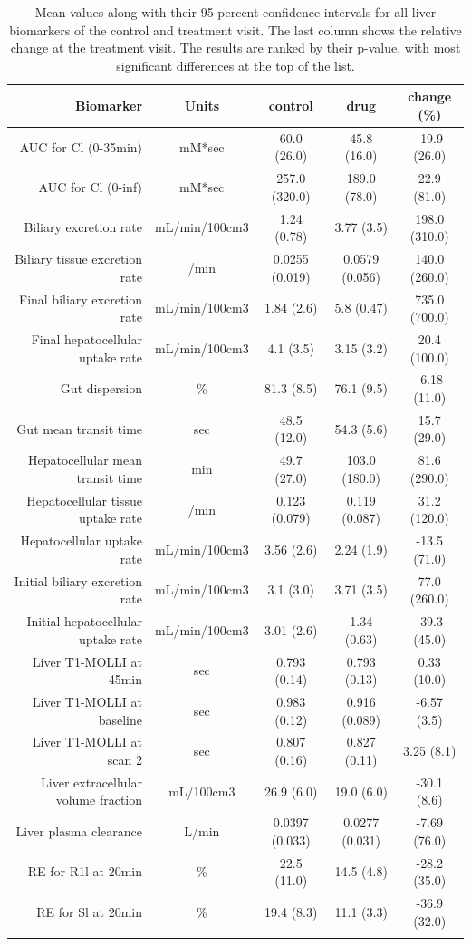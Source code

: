 \documentclass{epflreport}%
\begin{document}
\begin{longtable}{rcccc}%
\hline%
Biomarker&Units&control&drug&change (\%)\\%
\hline%
AUC for Cl (0{-}35min)&mM*sec&60.0 (26.0) &45.8 (16.0) &{-}19.9 (26.0) \\%
AUC for Cl (0{-}inf)&mM*sec&257.0 (320.0) &189.0 (78.0) &22.9 (81.0) \\%
Biliary excretion rate&mL/min/100cm3&1.24 (0.78) &3.77 (3.5) &198.0 (310.0) \\%
Biliary tissue excretion rate&/min&0.0255 (0.019) &0.0579 (0.056) &140.0 (260.0) \\%
Final biliary excretion rate&mL/min/100cm3&1.84 (2.6) &5.8 (0.47) &735.0 (700.0) \\%
Final hepatocellular uptake rate&mL/min/100cm3&4.1 (3.5) &3.15 (3.2) &20.4 (100.0) \\%
Gut dispersion&\%&81.3 (8.5) &76.1 (9.5) &{-}6.18 (11.0) \\%
Gut mean transit time&sec&48.5 (12.0) &54.3 (5.6) &15.7 (29.0) \\%
Hepatocellular mean transit time&min&49.7 (27.0) &103.0 (180.0) &81.6 (290.0) \\%
Hepatocellular tissue uptake rate&/min&0.123 (0.079) &0.119 (0.087) &31.2 (120.0) \\%
Hepatocellular uptake rate&mL/min/100cm3&3.56 (2.6) &2.24 (1.9) &{-}13.5 (71.0) \\%
Initial biliary excretion rate&mL/min/100cm3&3.1 (3.0) &3.71 (3.5) &77.0 (260.0) \\%
Initial hepatocellular uptake rate&mL/min/100cm3&3.01 (2.6) &1.34 (0.63) &{-}39.3 (45.0) \\%
Liver T1{-}MOLLI at 45min&sec&0.793 (0.14) &0.793 (0.13) &0.33 (10.0) \\%
Liver T1{-}MOLLI at baseline&sec&0.983 (0.12) &0.916 (0.089) &{-}6.57 (3.5) \\%
Liver T1{-}MOLLI at scan 2&sec&0.807 (0.16) &0.827 (0.11) &3.25 (8.1) \\%
Liver extracellular volume fraction&mL/100cm3&26.9 (6.0) &19.0 (6.0) &{-}30.1 (8.6) \\%
Liver plasma clearance&L/min&0.0397 (0.033) &0.0277 (0.031) &{-}7.69 (76.0) \\%
RE for R1l at 20min&\%&22.5 (11.0) &14.5 (4.8) &{-}28.2 (35.0) \\%
RE for Sl at 20min&\%&19.4 (8.3) &11.1 (3.3) &{-}36.9 (32.0) \\%
\hline%
\caption{Mean values along with their 95 percent confidence intervals for all liver biomarkers of the control and treatment visit. The last column shows the relative change at the treatment visit. The results are ranked by their p-value, with most significant differences at the top of the list.} \\%
\end{longtable}%
\clearpage%
\end{document}
